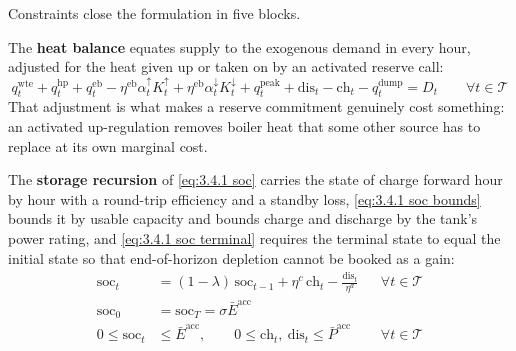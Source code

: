 Constraints close the formulation in five blocks.

The \textbf{heat balance} equates supply to the exogenous demand in every hour, adjusted for the heat given up or taken on by an activated reserve call:
\begin{equation}
    q^{\text{wte}}_t + q^{\text{hp}}_t + q^{\text{eb}}_t - \eta^{\text{eb}} \alpha^{\uparrow}_t K^{\uparrow}_t + \eta^{\text{eb}} \alpha^{\downarrow}_t K^{\downarrow}_t + q^{\text{peak}}_t + \text{dis}_t - \text{ch}_t - q^{\text{dump}}_t = D_t \qquad \forall t \in \mathcal{T} \label{eq:3.4.1 heat balance}
\end{equation}
That adjustment is what makes a reserve commitment genuinely cost something: an activated up-regulation removes boiler heat that some other source has to replace at its own marginal cost.

The \textbf{storage recursion} of \autoref{eq:3.4.1 soc} carries the state of charge forward hour by hour with a round-trip efficiency and a standby loss, \autoref{eq:3.4.1 soc bounds} bounds it by usable capacity and bounds charge and discharge by the tank's power rating, and \autoref{eq:3.4.1 soc terminal} requires the terminal state to equal the initial state so that end-of-horizon depletion cannot be booked as a gain:
\begin{align}
    \text{soc}_t &= (1 - \lambda)\,\text{soc}_{t-1} + \eta^{c}\,\text{ch}_t - \frac{\text{dis}_t}{\eta^{d}} && \forall t \in \mathcal{T} \label{eq:3.4.1 soc} \\
    \text{soc}_0 &= \text{soc}_T = \sigma \bar{E}^{\text{acc}} \label{eq:3.4.1 soc terminal} \\
    0 \leq \text{soc}_t &\leq \bar{E}^{\text{acc}}, \qquad 0 \leq \text{ch}_t,\ \text{dis}_t \leq \bar{P}^{\text{acc}} && \forall t \in \mathcal{T} \label{eq:3.4.1 soc bounds}
\end{align}


